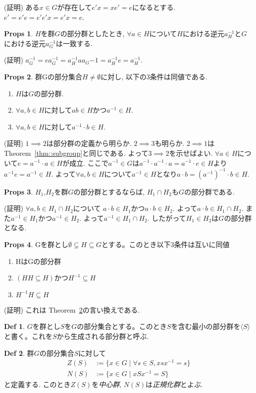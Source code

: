 \documentclass[dvipdfmx]{jsarticle}
\theoremstyle{definition}
\newtheorem{props}{Props}
\newtheorem{definition}{Def}
\numberwithin{equation}{section}
\numberwithin{props}{section}
\numberwithin{definition}{section}
\numberwithin{note}{section}
\begin{document}
(証明) ある$x\in G$が存在して$e'x=xe'=e$になるとする. $e'=e'e=e'e'x=e'x=e$.
\begin{props}
     $H$を群$G$の部分群としたとき, $\forall a\in H$について$H$における逆元$a_H^{-1}$と$G$における逆元$a_G^{-1}$は一致する.
\end{props}
(証明) $a_G^{-1}=ea_G^{-1}=a_H^{-1}aa_G{-1}=a_H^{-1}e=a_H^{-1}$.
\begin{props}\label{them::subgroup3}
     群Gの部分集合$H\neq \emptyset$に対し, 以下の3条件は同値である.
     \begin{enumerate}
          \item $H$は$G$の部分群.
          \item $\forall a,b \in H$に対して$ab\in H$かつ$ a^{-1}\in H$.
          \item $\forall a,b \in H$に対して$a^{-1}\cdot b\in H$.
     \end{enumerate}
\end{props}
(証明) $1\implies 2$は部分群の定義から明らか. $2\implies 3$も明らか.
$2\implies 1$は Theorem~\ref{thm::subgroup}と同じである.
よって$3\implies 2$を示せばよい.
$\forall a\in H$について$e=a^{-1}\cdot a\in H$が成立. ここで$a^{-1}\in G$は$a^{-1}\cdot a^{-1}\cdot a=a^{-1}\cdot e \in H$より$a^{-1}e=a^{-1}\in H$.
よって$\forall a,b \in H$について$a^{-1}\in H$となり$a\cdot b=(a^{-1})^{-1}\cdot b\in H$.
\begin{props}
     $H_1$,$H_2$を群$G$の部分群とするならば, $H_1\cap H_2$も$G$の部分群である.
\end{props}
(証明) $\forall a,b\in H_1\cap H_2$について $a\cdot b\in H_1$かつ$a\cdot b\in H_2$. よって$a\cdot b\in H_1\cap H_2$.
また$a^{-1}\in H_1$かつ$a^{-1}\in H_2$. よって$a^{-1}\in H_1\cap H_2$. したがって$H_1\in H_2$は$G$の部分群となる.
\begin{props}
     Gを群とし$\emptyset \subsetneq H\subseteq G$とする。このとき以下3条件は互いに同値
     \begin{enumerate}
          \item HはGの部分群
          \item $(HH\subseteq H)$かつ$H^{-1}\subseteq H$
          \item $H^{-1}H\subseteq H$
     \end{enumerate}
\end{props}
(証明) これは Theorem~\ref{them::subgroup3}の言い換えである.
\begin{definition}
     $G$を群とし$S$を$G$の部分集合とする。このとき$S$を含む最小の部分群を$\langle S \rangle$と書く。これを$S$から生成される部分群と呼ぶ.
\end{definition}
\begin{definition}
     群$G$の部分集合$S$に対して
     \begin{align}
          Z(S)&:=\lbrace x\in G\mid \forall s\in S, xsx^{-1}=s\rbrace\\
          N(S)&:=\lbrace x\in G \mid  xSx^{-1}=S\rbrace
     \end{align}
     と定義する. このとき$Z(S)$を\emph{中心群}, $N(S)$は\emph{正規化群}とよぶ.
\end{definition}
\end{document}

